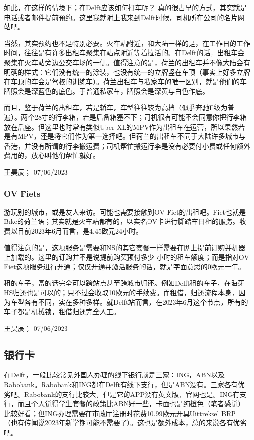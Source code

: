 如此，在这样的情境下；在Delft应该如何打车呢？ 真的很古早的方式，其实就是电话或者邮件提前预约。这里我就附上我来到Delft时候，\href{https://taxidelfland.nl/}{\uline{司机所在公司的名片网站吧}}。

当然，其实预约也不是特别必要。火车站附近，和大陆一样的是，在工作日的工作时间，往往是有许多出租车聚集在站点附近等着拉活的。在Delft的话，出租车会聚集在火车站旁边公交车场的一侧。值得注意的是，荷兰的出租车并不像大陆会有明确的样式：它们没有统一的涂装，也没有统一的立牌竖在车顶（事实上好多立牌在车顶的车会是驾校的训练车）。荷兰出租车与私家车的唯一区别，就是他们的车牌照会是深蓝色的底色。于普通私家车，牌照会是深黄与白色作底。

而且，鉴于荷兰的出租车，若是轿车，车型往往较为高档（似乎奔驰E级为普遍）。两个28寸的行李箱，若是后备箱塞不下；司机很有可能不会同意你把行李箱放在后座。但这里也时常有类似Uber XL的MPV作为出租车在运营，所以果然若是有MPV，还是将它们作为第一选择吧。但荷兰的出租车不同于大陆许多城市与香港，并没有所谓的行李搬运费；司机帮忙搬运行李是没有必要付小费或任何额外费用的，放心叫他们帮忙就好。
\begin{flushright}
王昊辰； 07/06/2023
\end{flushright}

\subsubsection{OV Fiets}
游玩别的城市，或是友人来访。可能也需要接触到OV Fiet的出租吧。Fiet也就是Bike的荷兰语；其实就是火车站都有的，以实名OV卡进行脚踏车日租的服务。收费以目前2023年6月而言，是4.45欧元24小时。

值得注意的是，这项服务是需要和NS的其它套餐一样需要在网上提前订购并机器上加载的。这里的订购并不是说提前购买预付多少
小时的租车额度；而是指对OV Fiet这项服务进行开通；仅仅开通并激活服务的话，就是字面意思的0欧元一年。

租的车子，富的话完全可以跨站点甚至跨城市归还。例如Delft租的车子，在海牙HS归还也是可以的；只不过会收取10欧元的手续费。而租借，归还流程本身，因为车型各有不同，实在多种多样。就Delft站而言，在2023年6月这个节点，所有的车子都是机械锁，租借归还完全人工。
\begin{flushright}
王昊辰； 07/06/2023
\end{flushright}

\subsection{银行卡}
在Delft，一般比较常见外国人办理的线下银行就是三家：ING，ABN以及Rabobank。Rabobank和ING都在Delft有线下支行，但是ABN没有。三家各有优劣吧。Rabobank的支行比较大，但是它的APP没有英文版，官网也是。ING有支行，而且个人觉得学生套餐的政策比ABN好一些，卡面也是纯橙色（笔者感觉）比较好看；但ING办理需要在市政厅注册时花费10.99欧元开具Uittreksel BRP （也有传闻说2023年新学期可能不需要了）。这也是额外成本，总的来说各有优劣吧。

